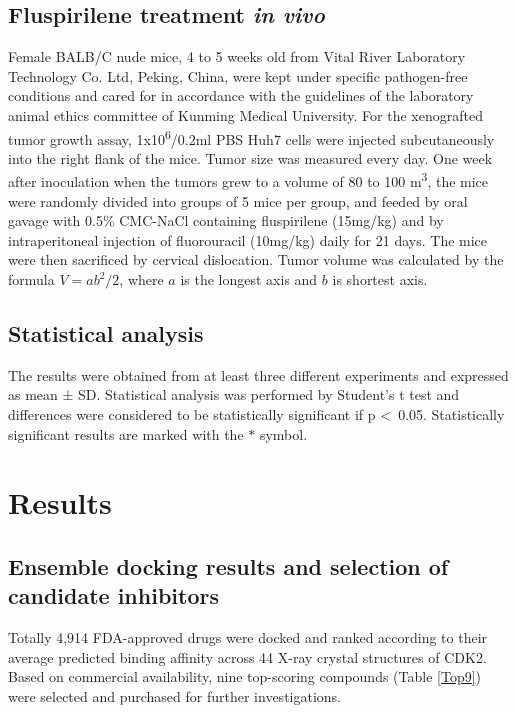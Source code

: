 \documentclass[10pt]{article}
\begin{document}
\subsection*{Fluspirilene treatment \textit{in vivo}}

Female BALB/C nude mice, 4 to 5 weeks old from Vital River Laboratory Technology Co. Ltd, Peking, China, were kept under specific pathogen-free conditions and cared for in accordance with the guidelines of the laboratory animal ethics committee of Kunming Medical University. For the xenografted tumor growth assay, 1x10\textsuperscript{6}/0.2ml PBS Huh7 cells were injected subcutaneously into the right flank of the mice. Tumor size was measured every day. One week after inoculation when the tumors grew to a volume of 80 to 100 m\textsuperscript{3}, the mice were randomly divided into groups of 5 mice per group, and feeded by oral gavage with 0.5\% CMC-NaCl containing fluspirilene (15mg/kg) and by intraperitoneal injection of fluorouracil (10mg/kg) daily for 21 days. The mice were then sacrificed by cervical dislocation. Tumor volume was calculated by the formula $V=ab^2/2$, where $a$ is the longest axis and $b$ is shortest axis.

\subsection*{Statistical analysis}

The results were obtained from at least three different experiments and expressed as mean ± SD. Statistical analysis was performed by Student’s t test and differences were considered to be statistically significant if p \textless\ 0.05. Statistically significant results are marked with the $\ast$ symbol.

\section*{Results}

\subsection*{Ensemble docking results and selection of candidate inhibitors}

Totally 4,914 FDA-approved drugs were docked and ranked according to their average predicted binding affinity across 44 X-ray crystal structures of CDK2. Based on commercial availability, nine top-scoring compounds (Table \ref{Top9}) were selected and purchased for further investigations.
\end{document}
